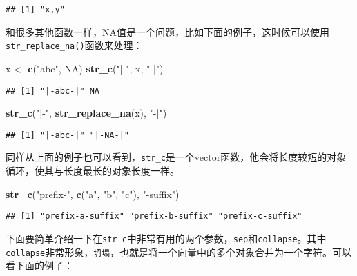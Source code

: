\documentclass[]{article}
\newenvironment{Shaded}{\begin{snugshade}}{\end{snugshade}}
\newcommand{\KeywordTok}[1]{\textcolor[rgb]{0.13,0.29,0.53}{\textbf{#1}}}
\newcommand{\NormalTok}[1]{#1}
\newcommand{\OtherTok}[1]{\textcolor[rgb]{0.56,0.35,0.01}{#1}}
\newcommand{\StringTok}[1]{\textcolor[rgb]{0.31,0.60,0.02}{#1}}
\begin{document}
\begin{verbatim}
## [1] "x,y"
\end{verbatim}

和很多其他函数一样，NA值是一个问题，比如下面的例子，这时候可以使用\texttt{str\_replace\_na()}函数来处理：

\begin{Shaded}
\begin{Highlighting}[]
\NormalTok{x <-}\StringTok{ }\KeywordTok{c}\NormalTok{(}\StringTok{"abc"}\NormalTok{, }\OtherTok{NA}\NormalTok{)}
\KeywordTok{str_c}\NormalTok{(}\StringTok{"|-"}\NormalTok{, x, }\StringTok{"-|"}\NormalTok{)}
\end{Highlighting}
\end{Shaded}

\begin{verbatim}
## [1] "|-abc-|" NA
\end{verbatim}

\begin{Shaded}
\begin{Highlighting}[]
\KeywordTok{str_c}\NormalTok{(}\StringTok{"|-"}\NormalTok{, }\KeywordTok{str_replace_na}\NormalTok{(x), }\StringTok{"-|"}\NormalTok{)}
\end{Highlighting}
\end{Shaded}

\begin{verbatim}
## [1] "|-abc-|" "|-NA-|"
\end{verbatim}

同样从上面的例子也可以看到，\texttt{str\_c}是一个vector函数，他会将长度较短的对象循环，使其与长度最长的对象长度一样。

\begin{Shaded}
\begin{Highlighting}[]
\KeywordTok{str_c}\NormalTok{(}\StringTok{"prefix-"}\NormalTok{, }\KeywordTok{c}\NormalTok{(}\StringTok{"a"}\NormalTok{, }\StringTok{"b"}\NormalTok{, }\StringTok{"c"}\NormalTok{), }\StringTok{"-suffix"}\NormalTok{)}
\end{Highlighting}
\end{Shaded}

\begin{verbatim}
## [1] "prefix-a-suffix" "prefix-b-suffix" "prefix-c-suffix"
\end{verbatim}

下面要简单介绍一下在\texttt{str\_c}中非常有用的两个参数，\texttt{sep}和\texttt{collapse}。其中\texttt{collapse}非常形象，\texttt{坍塌}，也就是将一个向量中的多个对象合并为一个字符。可以看下面的例子：
\end{document}
